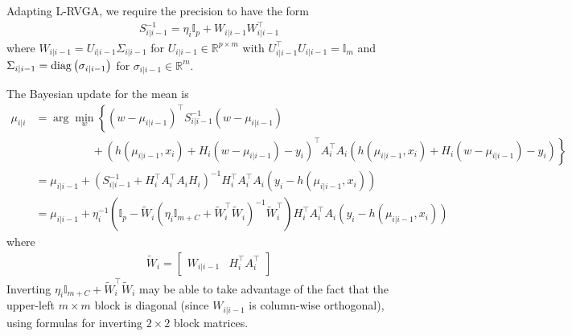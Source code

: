 Adapting L-RVGA, we require the precision to have the form
\begin{align}
S_{i\vert i-1}^{-1}=\eta_{i}\mathbb{I}_{p}+W_{i\vert i-1}W_{i\vert i-1}^{\top}
\end{align}
where $W_{i\vert i-1}=U_{i\vert i-1}\Sigma_{i\vert i-1}$ for $U_{i\vert i-1}\in\mathbb{R}^{p\times m}$
with $U_{i\vert i-1}^{\top}U_{i\vert i-1}=\mathbb{I}_{m}$ and $\Sigma_{i\vert i-1}={\rm diag}\left(\sigma_{i\vert i-1}\right)$
for $\sigma_{i\vert i-1}\in\mathbb{R}^{m}$. 

The Bayesian update for the mean is
\begin{align}
\mu_{i\vert i} & =\arg\min_{w}\left\{ \left(w-\mu_{i\vert i-1}\right)^{\top}S_{i\vert i-1}^{-1}\left(w-\mu_{i\vert i-1}\right)\right.
\\ &\qquad\qquad\quad +\left.\left(h\left(\mu_{i\vert i-1},x_{i}\right)+H_{i}\left(w-\mu_{i\vert i-1}\right)-y_{i}\right)^{\top}A_{i}^{\top}A_{i}\left(h\left(\mu_{i\vert i-1},x_{i}\right)+H_{i}\left(w-\mu_{i\vert i-1}\right)-y_{i}\right)\right\} \nonumber\\
 &=\mu_{i\vert i-1}+\left(S_{i\vert i-1}^{-1}+H_{i}^{\top}A_{i}^{\top}A_{i}H_{i}\right)^{-1}H_{i}^{\top}A_{i}^{\top}A_{i}\left(y_{i}-h\left(\mu_{i\vert i-1},x_{i}\right)\right)\\
 & =\mu_{i\vert i-1}+\eta_{i}^{-1}\left(\mathbb{I}_{p}-\tilde{W}_{i}\left(\eta_{i}\mathbb{I}_{m+C}+\tilde{W}_{i}^{\top}\tilde{W}_{i}\right)^{-1}\tilde{W}_{i}^{\top}\right)H_{i}^{\top}A_{i}^{\top}A_{i}\left(y_{i}-h\left(\mu_{i\vert i-1},x_{i}\right)\right) \label{eq:ORFit-bayes-mean-update}
\end{align}
where
\begin{align}
\tilde{W}_{i}=\left[\begin{array}{cc}
W_{i\vert i-1} & H_{i}^{\top}A_{i}^{\top}\end{array}\right]
\end{align}
Inverting $\eta_{i}\mathbb{I}_{m+C}+\tilde{W}_{i}^{\top}\tilde{W}_{i}$ may be able to take advantage of the fact that the upper-left $m\times m$ block is diagonal (since $W_{i|i-1}$ is column-wise orthogonal), using formulas for inverting $2\times2$ block matrices.

